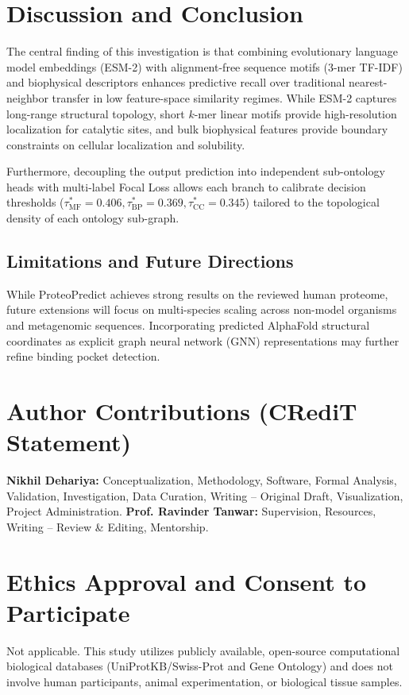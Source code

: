 \documentclass[twocolumn,10pt]{article}
\begin{document}
\section{Discussion and Conclusion}

The central finding of this investigation is that combining evolutionary language model embeddings (ESM-2) with alignment-free sequence motifs ($3$-mer TF-IDF) and biophysical descriptors enhances predictive recall over traditional nearest-neighbor transfer in low feature-space similarity regimes. While ESM-2 captures long-range structural topology, short $k$-mer linear motifs provide high-resolution localization for catalytic sites, and bulk biophysical features provide boundary constraints on cellular localization and solubility.

Furthermore, decoupling the output prediction into independent sub-ontology heads with multi-label Focal Loss allows each branch to calibrate decision thresholds ($\tau^*_{\text{MF}} = 0.406, \tau^*_{\text{BP}} = 0.369, \tau^*_{\text{CC}} = 0.345$) tailored to the topological density of each ontology sub-graph.

\subsection{Limitations and Future Directions}
While ProteoPredict achieves strong results on the reviewed human proteome, future extensions will focus on multi-species scaling across non-model organisms and metagenomic sequences. Incorporating predicted AlphaFold structural coordinates as explicit graph neural network (GNN) representations may further refine binding pocket detection.

\section*{Author Contributions (CRediT Statement)}
\textbf{Nikhil Dehariya:} Conceptualization, Methodology, Software, Formal Analysis, Validation, Investigation, Data Curation, Writing -- Original Draft, Visualization, Project Administration. \textbf{Prof. Ravinder Tanwar:} Supervision, Resources, Writing -- Review \& Editing, Mentorship.

\section*{Ethics Approval and Consent to Participate}
Not applicable. This study utilizes publicly available, open-source computational biological databases (UniProtKB/Swiss-Prot and Gene Ontology) and does not involve human participants, animal experimentation, or biological tissue samples.
\end{document}
